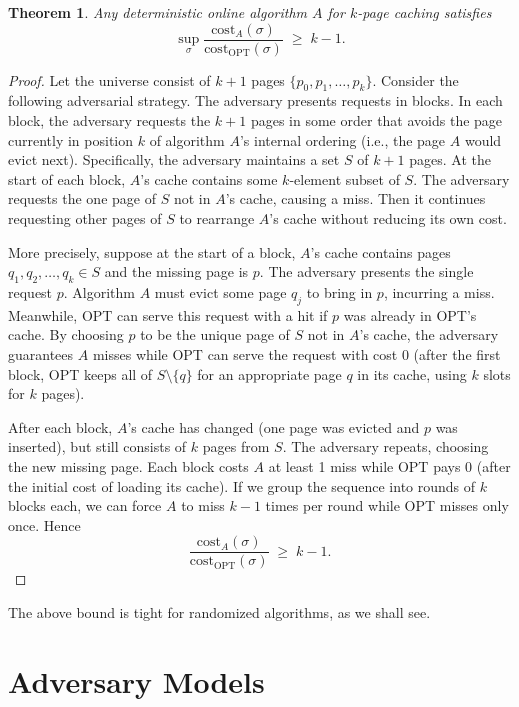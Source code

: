 \documentclass[twoside,12pt]{book}
\theoremstyle{plain}
\newtheorem{theorem}{Theorem}[chapter]
\theoremstyle{definition}
\theoremstyle{remark}
\begin{document}
\begin{theorem}\label{thm:paging-det-lb}
Any deterministic online algorithm $A$ for $k$-page caching satisfies
\[
  \sup_\sigma \frac{\mathrm{cost}_A(\sigma)}{\mathrm{cost}_{\mathrm{OPT}}(\sigma)} \;\ge\; k - 1.
\]
\end{theorem}

\begin{proof}
Let the universe consist of $k+1$ pages $\{p_0, p_1, \ldots, p_k\}$.
Consider the following adversarial strategy.  The adversary presents
requests in blocks.  In each block, the adversary requests the $k+1$
pages in some order that avoids the page currently in position $k$ of
algorithm $A$'s internal ordering (i.e., the page $A$ would evict
next).  Specifically, the adversary maintains a set $S$ of $k+1$ pages.
At the start of each block, $A$'s cache contains some $k$-element subset
of $S$.  The adversary requests the one page of $S$ not in $A$'s cache,
causing a miss.  Then it continues requesting other pages of $S$ to
rearrange $A$'s cache without reducing its own cost.

More precisely, suppose at the start of a block, $A$'s cache contains
pages $q_1, q_2, \ldots, q_k \in S$ and the missing page is $p$.  The
adversary presents the single request $p$.  Algorithm $A$ must evict
some page $q_j$ to bring in $p$, incurring a miss.  Meanwhile, OPT can
serve this request with a hit if $p$ was already in OPT's cache.  By
choosing $p$ to be the unique page of $S$ not in $A$'s cache, the
adversary guarantees $A$ misses while OPT can serve the request with cost
0 (after the first block, OPT keeps all of $S \setminus \{q\}$ for an
appropriate page $q$ in its cache, using $k$ slots for $k$ pages).

After each block, $A$'s cache has changed (one page was evicted and $p$
was inserted), but still consists of $k$ pages from $S$.  The adversary
repeats, choosing the new missing page.  Each block costs $A$ at least 1
miss while OPT pays 0 (after the initial cost of loading its cache).  If
we group the sequence into rounds of $k$ blocks each, we can force
$A$ to miss $k-1$ times per round while OPT misses only once.  Hence
\[
  \frac{\mathrm{cost}_A(\sigma)}{\mathrm{cost}_{\mathrm{OPT}}(\sigma)} \;\ge\; k-1.
\]
\end{proof}

The above bound is tight for randomized algorithms, as we shall see.

\section{Adversary Models}
\label{sec:adversary-models}
\end{document}
